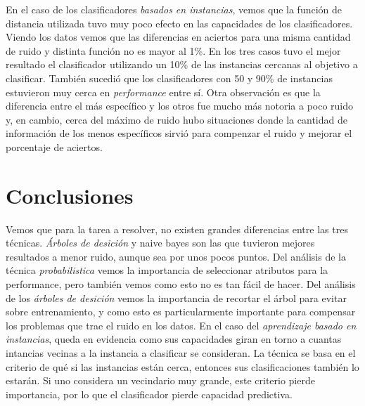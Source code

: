 \documentclass[a4paper,10pt]{article}
\begin{document}
En el caso de los clasificadores \emph{basados en instancias}, vemos que la función de distancia utilizada tuvo muy poco efecto en las capacidades de los clasificadores. Viendo los datos vemos que las diferencias en aciertos para una misma cantidad de ruido y distinta función no es mayor al 1\%. En los tres casos tuvo el mejor resultado el clasificador utilizando un 10\% de las instancias cercanas al objetivo a clasificar. También sucedió que los clasificadores con 50 y 90\% de instancias estuvieron muy cerca en \emph{performance} entre sí. Otra observación es que la diferencia entre el más específico y los otros fue mucho más notoria a poco ruido y, en cambio, cerca del máximo de ruido hubo situaciones donde la cantidad de información de los menos específicos sirvió para compenzar el ruido y mejorar el porcentaje de aciertos. 

\section{Conclusiones}

Vemos que para la tarea a resolver, no existen grandes diferencias entre las tres técnicas. \emph{Árboles de desición} y \textsf{naive bayes} son las que tuvieron mejores resultados a menor ruido, aunque sea por unos pocos puntos. Del análisis de la técnica \emph{probabilistica} vemos la importancia de seleccionar atributos para la performance, pero también vemos como esto no es tan fácil de hacer. Del análisis de los \emph{árboles de desición} vemos la importancia de recortar el árbol para evitar sobre entrenamiento, y como esto es particularmente importante para compensar los problemas que trae el ruido en los datos. En el caso del \emph{aprendizaje basado en instancias}, queda en evidencia como sus capacidades giran en torno a cuantas intancias vecinas a la instancia a clasificar se consideran. La técnica se basa en el criterio de qué si las instancias están cerca, entonces sus clasificaciones también lo estarán. Si uno considera un vecindario muy grande, este criterio pierde importancia, por lo que el clasificador pierde capacidad predictiva.
\end{document}
